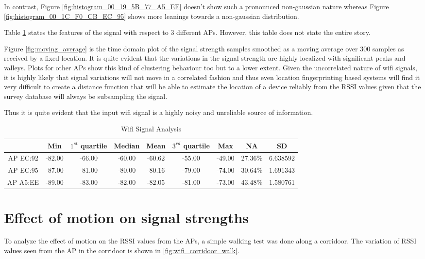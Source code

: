 In contrast, Figure \ref{fig:histogram_00_19_5B_77_A5_EE} doesn't show such a 
pronounced non-gaussian nature whereas 
Figure \ref{fig:histogram_00_1C_F0_CB_EC_95} shows more leanings towards a
non-gaussian distribution.

Table \ref{tbl:wifi_signal_analysis} states the features of the signal with 
respect to 3 different APs. However, this table does not state the entire 
story. 

Figure \ref{fig:moving_average} is the time domain plot of the signal strength
samples smoothed as a moving average over 300 samples as received by a fixed 
location. It is quite evident that the variations in the signal strength 
are highly localized with significant peaks and valleys. Plots for other APs
show this kind of clustering behaviour too but to a lower extent. 
Given the uncorrelated nature of wifi signals, it is highly likely that 
signal variations will not move in a correlated fashion and thus even 
location fingerprinting based systems will find it very difficult to 
create a distance function that will be able to estimate the location of a
device reliably from the RSSI values given that the survey database will 
always be subsampling the signal. 

Thus it is quite evident that the input wifi signal is a highly noisy and
unreliable source of information.


\begin{table}
\centering
\begin{tabular}{c c c c c c c c c}
\hline
\hline
 & Min & $1^{st}$ quartile & Median & Mean & $3^{rd}$ quartile & Max & NA & SD\\
\hline
AP EC:92 & -82.00 & -66.00 & -60.00 & -60.62 & -55.00 & -49.00 & 27.36\% & 6.638592\\
AP EC:95 & -87.00 & -81.00 & -80.00 & -80.16 & -79.00 & -74.00 & 30.64\% & 1.691343\\
AP A5:EE & -89.00 & -83.00 & -82.00 & -82.05 & -81.00 & -73.00 & 43.48\% & 1.580761\\
\hline
\end{tabular}
\caption{Wifi Signal Analysis\label{tbl:wifi_signal_analysis}}
\end{table}

\section{Effect of motion on signal strengths}

To analyze the effect of motion on the RSSI values from the APs, a simple walking
test was done along a corridoor. The variation of RSSI values seen from the AP in
the corridoor is shown in \ref{fig:wifi_corridoor_walk}.

